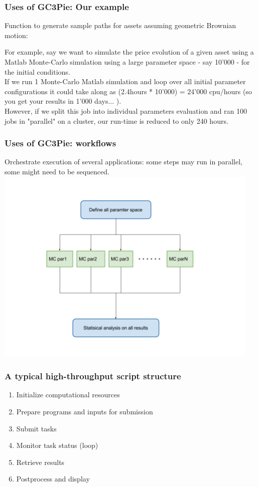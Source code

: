 \documentclass[english,serif,mathserif,xcolor=pdftex,dvipsnames,table]{beamer}
\begin{document}
\begin{frame}[fragile]
  \frametitle{Uses of GC3Pie: Our example}
 
  Function to generate sample paths for assets assuming geometric Brownian motion:

  \+
  \begin{scriptsize}
    For example, say we want to simulate the price evolution of a given asset using a Matlab Monte-Carlo simulation using a large parameter space - say 10'000 - for the initial conditions. \\ If we run 1 Monte-Carlo Matlab simulation and loop over all initial parameter configurations it could take along as (2.4hours * 10'000) = 24'000 cpu/hours (so you get your results in 1'000 days... ).\\ However, if we split this job into individual parameters evaluation and ran 100 jobs in "parallel" on a cluster, our run-time is reduced to only 240 hours.\\
  \end{scriptsize}
\end{frame}


\begin{frame}
  \frametitle{Uses of GC3Pie: workflows}

  Orchestrate execution of several applications:
  some steps may run in parallel, some might need to be sequenced.
  \includegraphics[width=0.95\textwidth]{fig/Matlab-scaling.png}
\end{frame}


\begin{frame}
  \frametitle{A typical high-throughput script structure}

  \begin{enumerate}
  \item Initialize computational resources
  \item Prepare programs and inputs for submission
  \item Submit tasks
  \item Monitor task status (loop)
  \item Retrieve results
  \item Postprocess and display
  \end{enumerate}
\end{frame}
\end{document}
